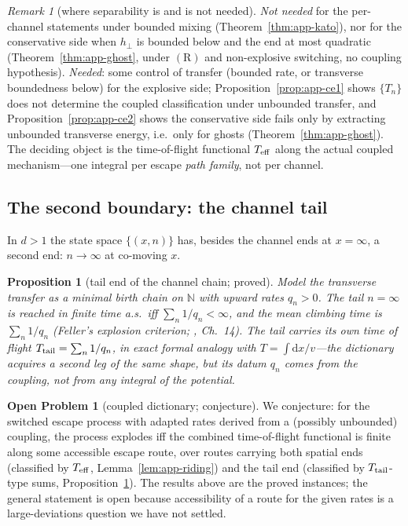 \documentclass[11pt]{article}
\newtheorem{proposition}[theorem]{Proposition}
\theoremstyle{definition}
\newtheorem{openproblem}[theorem]{Open Problem}
\theoremstyle{remark}
\newtheorem{remark}[theorem]{Remark}
\newcommand{\dd}{\mathrm{d}}
\begin{document}
\begin{remark}[where separability is and is not needed]
\emph{Not needed} for the per-channel statements under bounded mixing
(Theorem~\ref{thm:app-kato}), nor for the conservative side when
$h_{\perp}$ is bounded below and the end at most quadratic
(Theorem~\ref{thm:app-ghost}, under $(\mathrm R)$ and non-explosive switching, no coupling hypothesis).
\emph{Needed}:
some control of transfer (bounded rate, or transverse boundedness
below) for the explosive side; Proposition~\ref{prop:app-ce1} shows
$\{T_{n}\}$ does not determine the coupled classification under
unbounded transfer, and Proposition~\ref{prop:app-ce2} shows the
conservative side fails only by extracting unbounded transverse energy,
i.e.\ only for ghosts (Theorem~\ref{thm:app-ghost}). The deciding
object is the time-of-flight functional $T_{\rm eff}$ along the actual
coupled mechanism---one integral per escape \emph{path family}, not per
channel.
\end{remark}

\subsection{The second boundary: the channel tail}
\label{app:multiD-tail}

In $d>1$ the state space $\{(x,n)\}$ has, besides the channel ends at
$x=\infty$, a second end: $n\to\infty$ at co-moving $x$.

\begin{proposition}[tail end of the channel chain; proved]
\label{prop:app-tail}
Model the transverse transfer as a minimal birth chain on $\mathbb N$
with upward rates $q_{n}>0$. The tail $n=\infty$ is reached in finite
time a.s.\ iff $\sum_{n}1/q_{n}<\infty$, and the mean climbing time is
$\sum_{n}1/q_{n}$ (Feller's explosion criterion; \cite{KarlinTaylor}, Ch.~14).
The tail carries its own time of flight
$T_{\rm tail}=\sum_{n}1/q_{n}$, in exact formal analogy with
$T=\int\dd x/v$---\emph{the dictionary acquires a second leg of the
same shape}, but its datum $q_{n}$ comes from the coupling, not from
any integral of the potential.
\end{proposition}

\begin{openproblem}[coupled dictionary; conjecture]
\label{conj:app-coupled}
We conjecture: for the switched escape process with adapted rates
derived from a (possibly unbounded) coupling, the process explodes iff
the combined time-of-flight functional is finite along some accessible
escape route, over routes carrying both spatial ends (classified by
$T_{\rm eff}$, Lemma~\ref{lem:app-riding}) and the tail end (classified
by $T_{\rm tail}$-type sums, Proposition~\ref{prop:app-tail}). The
results above are the proved instances; the general statement is open
because accessibility of a route for the given rates is a
large-deviations question we have not settled.
\end{openproblem}
\end{document}

